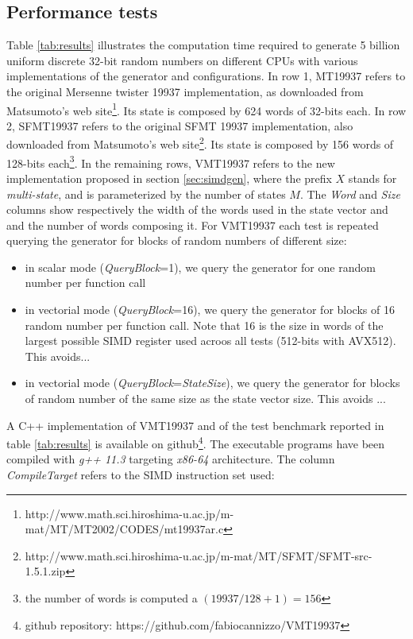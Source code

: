 \documentclass[preprint,1p,times]{elsarticle}
\begin{document}
			\subsection{Performance tests}
			\label{sec:tests}
			Table \ref{tab:results} illustrates the computation time required to generate 5 billion uniform discrete 32-bit random numbers on different CPUs with various implementations of the generator and configurations.
			In row 1, MT19937 refers to the original Mersenne twister 19937 implementation, as downloaded from Matsumoto's web site\footnote{\label{fn:orig}http://www.math.sci.hiroshima-u.ac.jp/m-mat/MT/MT2002/CODES/mt19937ar.c}. Its state is composed by 624 words of 32-bits each.
			In row 2, SFMT19937 refers to the original SFMT 19937 implementation, also downloaded from Matsumoto's web site\footnote{http://www.math.sci.hiroshima-u.ac.jp/m-mat/MT/SFMT/SFMT-src-1.5.1.zip}. Its state is composed by 156 words of 128-bits each\footnote{the number of words is computed a $(19937 / 128 + 1)=156$}.
			In the remaining rows, VMT19937 refers to the new implementation proposed in section \ref{sec:simdgen}, where the prefix $X$ stands for \textit{multi-state}, and is parameterized by the number of states $M$.
			The \textit{Word} and \textit{Size} columns show respectively the width of the words used in the state vector and and the number of words composing it.
			For VMT19937 each test is repeated querying the generator for blocks of random numbers of different size:
			\begin{itemize}
				\item in scalar mode (\textit{QueryBlock}=1), we query the generator for one random number per function call
				\item in vectorial mode (\textit{QueryBlock}=16), we query the generator for blocks of 16 random number per function call. Note that 16 is the size in words of the largest possible SIMD register used acroos all tests (512-bits with AVX512). This avoids...
				\item in vectorial mode (\textit{QueryBlock}=\textit{StateSize}), we query the generator for blocks of random number of the same size as the state vector size. This avoids ...
			\end{itemize}
			A C++ implementation of VMT19937 and of the test benchmark reported in table \ref{tab:results} is available on github\footnote{github repository: https://github.com/fabiocannizzo/VMT19937}. The executable programs have been compiled with \textit{g++ 11.3} targeting \textit{x86-64} architecture. The column \textit{CompileTarget} refers to the SIMD instruction set used:
\end{document}
